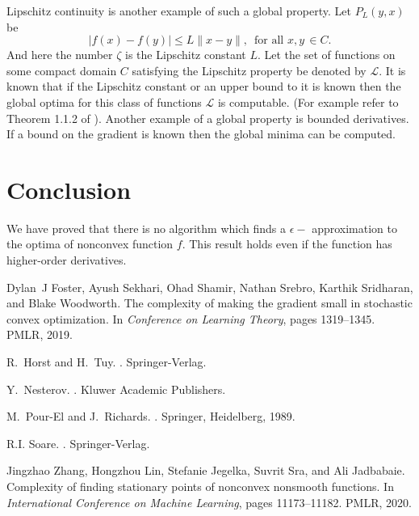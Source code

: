 	\begin{remark}
		Lipschitz continuity is another example of such a global property. Let $P_L(y,x)$ be 
		\[|f(x)-f(y)| \leq L \parallel x - y \parallel, \, \mbox{ for all } x,y \, \in C.\]
		And here the number $\zeta$ is the Lipschitz constant $L$. Let the set of functions on some compact domain $C$ satisfying the Lipschitz property be denoted by $\mathcal{L}$. It is known that if the Lipschitz constant or an upper bound to it is known then the global optima for this class of functions $\mathcal{L}$ is computable. (For example refer to Theorem 1.1.2 of \cite{nest}). Another example of a global property is bounded derivatives. If a bound on the gradient is known then the global minima can be computed.
	\end{remark}
	
	\section{Conclusion}
	We have proved that there is no algorithm which finds a $\epsilon-$ approximation to the optima of nonconvex function $f$. This result holds even if the function has higher-order derivatives.
	
	
%	
\begin{thebibliography}{1}

Dylan~J Foster, Ayush Sekhari, Ohad Shamir, Nathan Srebro, Karthik Sridharan,
  and Blake Woodworth.
\newblock The complexity of making the gradient small in stochastic convex
  optimization.
\newblock In {\em Conference on Learning Theory}, pages 1319--1345. PMLR, 2019.

R.~Horst and H.~Tuy.
.
\newblock Springer-Verlag.

Y.~Nesterov.
.
\newblock Kluwer Academic Publishers.

M.~Pour-El and J.~Richards.
.
\newblock Springer, Heidelberg, 1989.

R.I. Soare.
.
\newblock Springer-Verlag.

Jingzhao Zhang, Hongzhou Lin, Stefanie Jegelka, Suvrit Sra, and Ali Jadbabaie.
\newblock Complexity of finding stationary points of nonconvex nonsmooth
  functions.
\newblock In {\em International Conference on Machine Learning}, pages
  11173--11182. PMLR, 2020.

\end{thebibliography}
